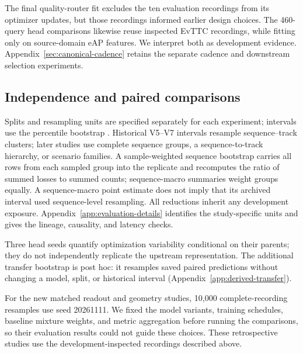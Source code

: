 The final quality-router fit excludes the ten evaluation recordings from its optimizer updates, but those recordings informed earlier design choices. The 460-query head comparisons likewise reuse inspected EvTTC recordings, while fitting only on source-domain eAP features. We interpret both as development evidence. Appendix~\ref{sec:canonical-cadence} retains the separate cadence and downstream selection experiments.

\subsection{Independence and paired comparisons}
Splits and resampling units are specified separately for each experiment; intervals use the percentile bootstrap \citep{efron1979}. Historical V5--V7 intervals resample sequence--track clusters; later studies use complete sequence groups, a sequence-to-track hierarchy, or scenario families. A sample-weighted sequence bootstrap carries all rows from each sampled group into the replicate and recomputes the ratio of summed losses to summed counts; sequence-macro summaries weight groups equally. A sequence-macro point estimate does not imply that its archived interval used sequence-level resampling. All reductions inherit any development exposure. Appendix~\ref{app:evaluation-details} identifies the study-specific units and gives the lineage, causality, and latency checks. 

Three head seeds quantify optimization variability conditional on their parents; they do not independently replicate the upstream representation. The additional transfer bootstrap is post hoc: it resamples saved paired predictions without changing a model, split, or historical interval (Appendix~\ref{app:derived-transfer}).

For the new matched readout and geometry studies, 10,000 complete-recording resamples use seed 20261111. We fixed the model variants, training schedules, baseline mixture weights, and metric aggregation before running the comparisons, so their evaluation results could not guide these choices. These retrospective studies use the development-inspected recordings described above.

